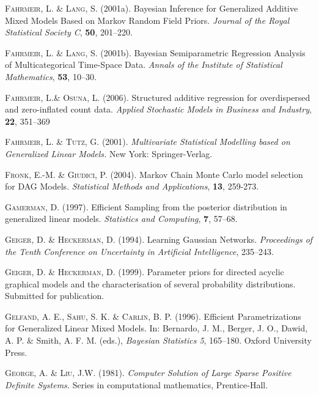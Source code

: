 \begin{thebibliography}{99}
 {\scshape Fahrmeir, L. \& Lang, S.} (2001a).
 Bayesian Inference for Generalized Additive Mixed Models Based on Markov Random Field Priors.
 {\it Journal of the Royal Statistical Society C}, {\bf 50}, 201--220.

 {\scshape Fahrmeir, L. \& Lang, S.} (2001b).
 Bayesian Semiparametric Regression Analysis of Multicategorical Time-Space Data.
 {\it Annals of the Institute of Statistical Mathematics}, {\bf 53}, 10--30.

 {\scshape Fahrmeir, L.\& Osuna, L.} (2006).
 Structured additive regression for overdispersed and zero-inflated count data.
 {\it Applied Stochastic Models in Business and Industry}, {\bf 22}, 351--369

 {\scshape Fahrmeir, L. \& Tutz, G.} (2001).
 {\it Multivariate Statistical Modelling based on Generalized Linear Models.}
 New York: Springer-Verlag.

 {\scshape Fronk, E.-M. \& Giudici, P.} (2004).
 Markov Chain Monte Carlo model selection for DAG Models.
 {\it Statistical Methods and Applications}, {\bf 13}, 259-273.

 {\scshape Gamerman, D.} (1997).
 Efficient Sampling from the posterior distribution in generalized linear models.
 {\it Statistics and Computing}, {\bf 7}, 57--68.

 {\scshape Geiger, D. \& Heckerman, D.} (1994).
 Learning Gaussian Networks.
 {\it Proceedings of the Tenth Conference on Uncertainty in Artificial Intelligence}, 235--243.

 {\scshape Geiger, D. \& Heckerman, D.} (1999).
 Parameter priors for directed acyclic graphical models and the characterisation of several probability distributions.
 Submitted for publication.

 {\scshape Gelfand, A. E., Sahu, S. K. \& Carlin, B. P.} (1996).
 Efficient Parametrizations for Genera\-lized Linear Mixed Models.
 In: Bernardo, J. M., Berger, J. O., Dawid, A. P. \& Smith, A. F. M. (eds.),
 {\it Bayesian Statistics 5}, 165--180.
 Oxford University Press.

 {\scshape George, A. \& Liu, J.W.} (1981).
 {\it Computer Solution of Large Sparse Positive Definite Systems.}
 Series in computational mathematics, Prentice-Hall.


\end{thebibliography}
